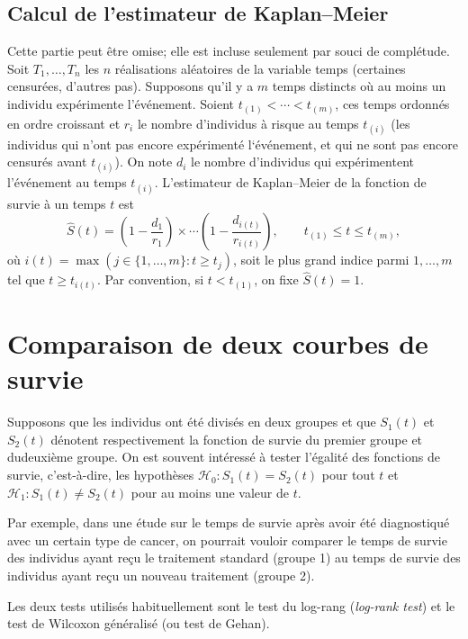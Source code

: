 \documentclass[
  11pt,
  letterpaper,
]{book}
\theoremstyle{definition}
\theoremstyle{definition}
\theoremstyle{definition}
\theoremstyle{remark}
\begin{document}
\hypertarget{calcul-de-lestimateur-de-kaplanmeier}{%
\subsection{Calcul de l'estimateur de Kaplan--Meier}\label{calcul-de-lestimateur-de-kaplanmeier}}

Cette partie peut être omise; elle est incluse seulement par souci de complétude. Soit \(T_1, \ldots, T_n\) les \(n\) réalisations aléatoires de la variable temps (certaines censurées, d'autres pas). Supposons qu'il y a \(m\) temps distincts où au moins un individu expérimente l'événement. Soient \(t_{(1)} < \cdots < t_{(m)}\), ces temps ordonnés en ordre croissant et \(r_i\) le nombre d'individus à risque au temps \(t_{(i)}\) (les individus qui n'ont pas encore expérimenté l`événement, et qui ne sont pas encore censurés avant \(t_{(i)}\)). On note \(d_i\) le nombre d'individus qui expérimentent l'événement au temps \(t_{(i)}\). L'estimateur de Kaplan--Meier de la fonction de survie à un temps \(t\) est
\[ \widehat{S}(t) = \left( 1- \frac{d_1}{r_1}\right) \times \cdots \left( 1- \frac{d_{i(t)}}{r_{i(t)}}\right), \qquad t_{(1)} \leq t \leq t_{(m)},
\]
où \(i(t) =\max(j \in \{1, \ldots, m\}: t \geq t_{j})\), soit le plus grand indice parmi \(1, \ldots, m\) tel que \(t \geq t_{i(t)}\). Par convention, si \(t < t_{(1)}\), on fixe \(\widehat{S}(t)=1\).

\hypertarget{comparaison-de-deux-courbes-de-survie}{%
\section{Comparaison de deux courbes de survie}\label{comparaison-de-deux-courbes-de-survie}}

Supposons que les individus ont été divisés en deux groupes et que \(S_1(t)\) et \(S_2(t)\) dénotent respectivement la fonction de survie du premier groupe et dudeuxième groupe. On est souvent intéressé à tester l'égalité des fonctions de survie, c'est-à-dire, les hypothèses \(\mathcal{H}_0: S_1(t) = S_2(t)\) pour tout \(t\) et \(\mathcal{H}_1: S_1(t) \neq S_2(t)\) pour au moins une valeur de \(t\).

Par exemple, dans une étude sur le temps de survie après avoir été diagnostiqué avec un certain type de cancer, on pourrait vouloir comparer le temps de survie des individus ayant reçu le traitement standard (groupe 1) au temps de survie des individus ayant reçu un nouveau traitement (groupe 2).

Les deux tests utilisés habituellement sont le test du log-rang (\emph{log-rank test}) et le test de Wilcoxon généralisé (ou test de Gehan).
\end{document}
